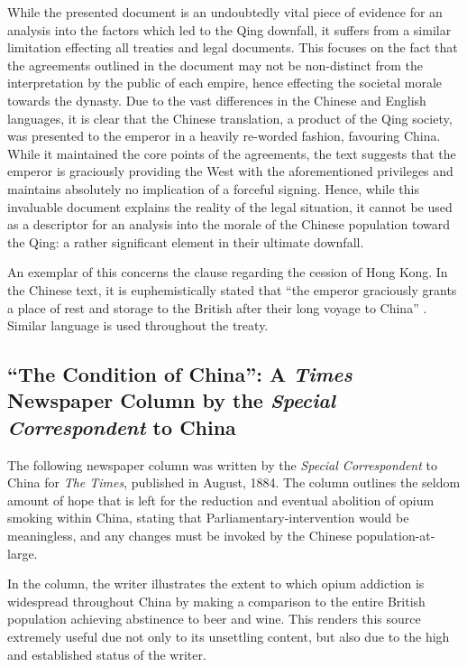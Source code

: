 \documentclass{article}
\begin{document}
        While the presented document is an undoubtedly vital piece of evidence for an analysis into the factors which led to the Qing downfall, it suffers from a similar limitation effecting all treaties and legal documents. This focuses on the fact that the agreements outlined in the document may not be non-distinct from the interpretation by the public of each empire, hence effecting the societal morale towards the dynasty. Due to the vast differences in the Chinese and English languages, it is clear that the Chinese translation, a product of the Qing society, was presented to the emperor in a heavily re-worded fashion, favouring China. While it maintained the core points of the agreements, the text suggests that the emperor is graciously providing the West with the aforementioned privileges and maintains absolutely no implication of a forceful signing. Hence, while this invaluable document explains the reality of the legal situation, it cannot be used as a descriptor for an analysis into the morale of the Chinese population toward the Qing: a rather significant element in their ultimate downfall.

        An exemplar of this concerns the clause regarding the cession of Hong Kong. In the Chinese text, it is euphemistically stated that ``the emperor graciously grants a place of rest and storage to the British after their long voyage to China''
\autocite{Zhang:2007}. Similar language is used throughout the treaty.

\subsection{``The Condition of China'': A \textit{Times} Newspaper Column by the \textit{Special Correspondent} to China}

        The following newspaper column was written by the \textit{Special Correspondent} to China for \textit{The Times}, published in August, 1884. The column outlines the seldom amount of hope that is left for the reduction and eventual abolition of opium smoking within China, stating that Parliamentary-intervention would be meaningless, and any changes must be invoked by the Chinese population-at-large.

        

        In the column, the writer illustrates the extent to which opium addiction is widespread throughout China by making a comparison to the entire British population achieving abstinence to beer and wine. This renders this source extremely useful due not only to its unsettling content, but also due to the high and established status of the writer.
\end{document}
